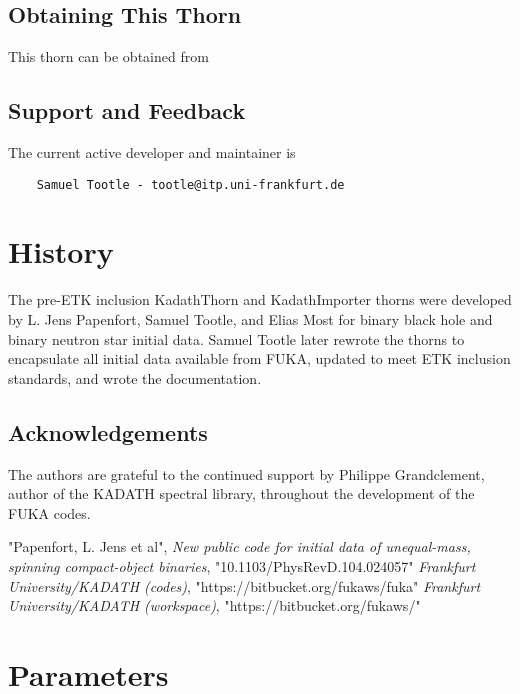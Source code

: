 \subsection{Obtaining This Thorn}
This thorn can be obtained from \cite{fukaws}

\subsection{Support and Feedback}
The current active developer and maintainer is
\begin{verbatim}
    Samuel Tootle - tootle@itp.uni-frankfurt.de
\end{verbatim}

\section{History}
The pre-ETK inclusion KadathThorn and KadathImporter thorns were developed by L. Jens Papenfort, 
Samuel Tootle, and Elias Most for binary black hole and binary neutron star initial data. 
Samuel Tootle later rewrote the thorns to encapsulate all initial data available
from FUKA, updated to meet ETK inclusion standards, and wrote the documentation.

\subsection{Acknowledgements}
The authors are grateful to the continued support by Philippe Grandclement, author of
the KADATH spectral library, throughout the development of the FUKA codes.

\begin{thebibliography}{9}
    "Papenfort, L. Jens et al", \emph{New public code for initial data of unequal-mass, spinning compact-object binaries},
        "10.1103/PhysRevD.104.024057"
    \emph{Frankfurt University/KADATH (codes)}, "{https://bitbucket.org/fukaws/fuka}"
    \emph{Frankfurt University/KADATH (workspace)}, "{https://bitbucket.org/fukaws/}"

\end{thebibliography}




\section{Parameters} 


